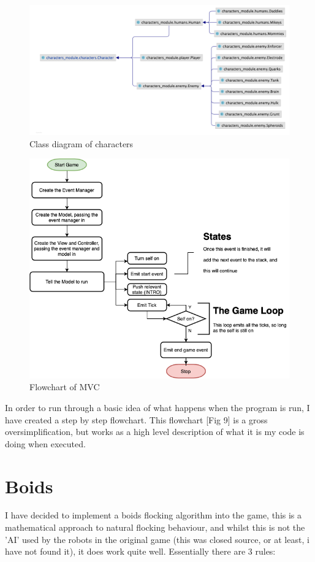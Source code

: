 \documentclass[a4paper, 11pt]{report}
\begin{document}
\begin{figure}[!ht]
  \includegraphics[width=0.8\linewidth]{class2.png}
  \centering
  \caption{Class diagram of characters}
  \label{fig:classeschars}
\end{figure}

\begin{figure}[!ht]
  \includegraphics[width=0.8\linewidth]{flowchart}
  \centering
  \caption{Flowchart of MVC}
  \label{fig:flowchart}
\end{figure}

In order to run through a basic idea of what happens when the program is run, I have created a step by step flowchart. This flowchart [Fig 9] is a gross oversimplification, but works as a high level description of what it is my code is doing when executed.

\section{Boids}
I have decided to implement a boids flocking algorithm into the game, this is a mathematical approach to natural flocking behaviour, and whilst this is not the 'AI' used by the robots in the original game (this was closed source, or at least, i have not found it), it does work quite well. Essentially there are 3 rules:
\end{document}
